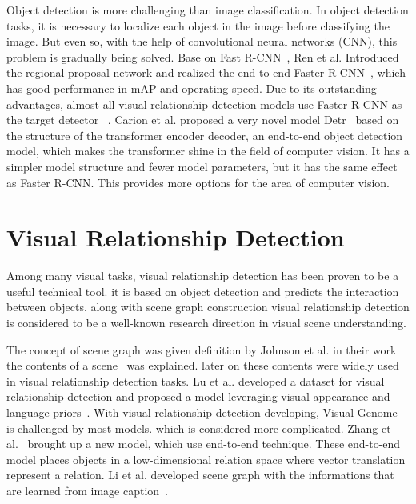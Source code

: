 Object detection is more challenging than image classification. In object detection tasks, it is necessary to localize each object in the image before classifying the image. But even so, with the help of convolutional neural networks (CNN), this problem is gradually being solved. Base on Fast R-CNN~\cite{girshick2015fast}, Ren et al. Introduced the regional proposal network and realized the end-to-end Faster R-CNN~\cite{ren2016faster}, which has good performance in mAP and operating speed. Due to its outstanding advantages, almost all visual relationship detection models use Faster R-CNN as the target detector ~\cite{yang2018graph, zellers2018neural, zhang2019graphical}. Carion et al. proposed a very novel model Detr~\cite{carion2020end} based on the structure of the transformer encoder decoder, an end-to-end object detection model, which makes the transformer shine in the field of computer vision. It has a simpler model structure and fewer model parameters, but it has the same effect as Faster R-CNN. This provides more options for the area of computer vision.

\section{Visual Relationship Detection}
Among many visual tasks, visual relationship detection has been proven to be a useful technical tool. it is based on object detection and predicts the interaction between objects. along with scene graph construction visual relationship detection is considered to be a well-known research direction in visual scene understanding.

The concept of scene graph was given definition by Johnson et al. in their work the contents of a scene~\cite{johnson2015image} was explained. later on these contents were widely used in visual relationship detection tasks. Lu et al. developed a dataset for visual relationship detection and proposed a model leveraging visual appearance and language priors~\cite{girshick2015fast}. With visual relationship detection developing, Visual Genome~\cite{krishna2017visual} is challenged by most models. which is considered more complicated. Zhang et al.~\cite{zhang2017visual} brought up a new model, which use end-to-end technique. These end-to-end model places objects in a low-dimensional relation space where vector translation represent a relation. Li et al. developed scene graph with the informations that are learned from image caption~\cite{li2017scene}.

